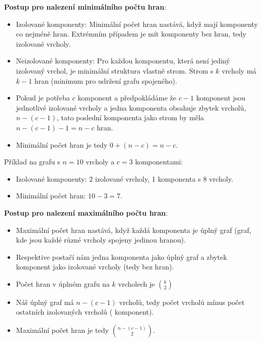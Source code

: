 \documentclass[10pt, a4paper]{ReportSheet}
\begin{document}
    \textbf{Postup pro nalezení minimálního počtu hran}:
    \begin{itemize}
        \item Izolované komponenty: Minimální počet hran nastává, když mají komponenty co nejméně hran. Extrémním
        případem je mít komponenty bez hran, tedy izolované vrcholy.
        \item Neizolované komponenty: Pro každou komponentu, která není jediný izolovaný vrchol, je minimální
        struktura vlastně strom. Strom s $k$ vrcholy má $k-1$ hran (minimum pro udržení grafu spojeného).
        \item Pokud je potřeba $c$ komponent a předpokládáme že $c-1$ komponent jsou jednotlivé izolované vrcholy a jedna komponenta obsahuje zbytek vrcholů, $n-(c-1)$, tato poslední komponenta jako strom by měla $n-(c-1)-1=n-c$ hran.
        \item Minimální počet hran je tedy $0 + (n-c) = n-c$.
    \end{itemize}

    Příklad na grafu s $n=10$ vrcholy a $c=3$ komponentami:
    \begin{itemize}
        \item Izolované komponenty: 2 izolované vrcholy, 1 komponenta s 8 vrcholy.
        \item Minimální počet hran: $10 - 3 = 7$.
    \end{itemize}


    \textbf{Postup pro nalezení maximálního počtu hran}:
    \begin{itemize}
        \item Maximální počet hran nastává, když každá komponenta je úplný graf (graf, kde jsou každé různé vrcholy spojeny jedinou hranou).
        \item Respektive postačí nám jedna komponenta jako úplný graf a zbytek komponent jako izolované vrcholy (tedy
        bez hran).
        \item Počet hran v úplném grafu na $k$ vrcholech je $\binom{k}{2}$
        \item Náš úplný graf má $n-(c-1)$ vrcholů, tedy počet vrcholů mínus počet ostatních izolovaných vrcholů (
        komponent).
        \item Maximální počet hran je tedy $\binom{n-(c-1)}{2}$.
    \end{itemize}
\end{document}
